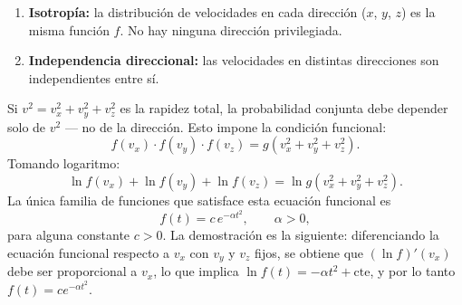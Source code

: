 \documentclass[12pt, a4paper]{book}
\numberwithin{equation}{chapter}
\begin{document}
\begin{enumerate}[label=\textbf{\roman*)}]
	\item \textbf{Isotropía:} la distribución de velocidades en
	cada dirección ($x$, $y$, $z$) es la misma función $f$.
	No hay ninguna dirección privilegiada.
	\item \textbf{Independencia direccional:} las velocidades en
	distintas direcciones son independientes entre sí.
\end{enumerate}

Si $v^2 = v_x^2 + v_y^2 + v_z^2$ es la rapidez total, la
probabilidad conjunta debe depender solo de $v^2$ --- no de
la dirección. Esto impone la condición funcional:
\[
f(v_x)\cdot f(v_y)\cdot f(v_z) = g(v_x^2 + v_y^2 + v_z^2).
\]
Tomando logaritmo:
\[
\ln f(v_x) + \ln f(v_y) + \ln f(v_z)
= \ln g(v_x^2 + v_y^2 + v_z^2).
\]
La única familia de funciones que satisface esta ecuación
funcional es
\[
f(t) = c\, e^{-\alpha t^2}, \qquad \alpha > 0,
\]
para alguna constante $c > 0$. La demostración es la siguiente:
diferenciando la ecuación funcional respecto a $v_x$ con $v_y$
y $v_z$ fijos, se obtiene que $(\ln f)'(v_x)$ debe ser
proporcional a $v_x$, lo que implica $\ln f(t) = -\alpha t^2 +
\text{cte}$, y por lo tanto $f(t) = ce^{-\alpha t^2}$.
\end{document}
